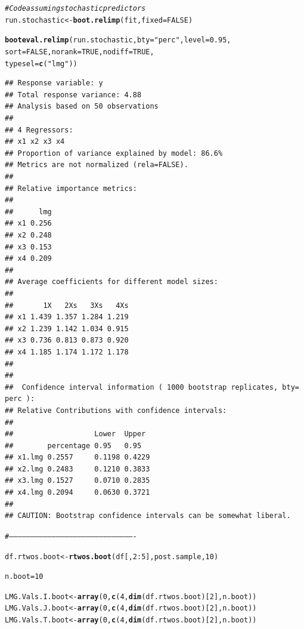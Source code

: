 \documentclass[11pt,a4paper,twoside]{book}
\makeatletter
\newcommand{\hlnum}[1]{\textcolor[rgb]{0.686,0.059,0.569}{#1}}%
\newcommand{\hlstr}[1]{\textcolor[rgb]{0.192,0.494,0.8}{#1}}%
\newcommand{\hlcom}[1]{\textcolor[rgb]{0.678,0.584,0.686}{\textit{#1}}}%
\newcommand{\hlopt}[1]{\textcolor[rgb]{0,0,0}{#1}}%
\newcommand{\hlstd}[1]{\textcolor[rgb]{0.345,0.345,0.345}{#1}}%
\newcommand{\hlkwb}[1]{\textcolor[rgb]{0.69,0.353,0.396}{#1}}%
\newcommand{\hlkwc}[1]{\textcolor[rgb]{0.333,0.667,0.333}{#1}}%
\newcommand{\hlkwd}[1]{\textcolor[rgb]{0.737,0.353,0.396}{\textbf{#1}}}%
\newenvironment{kframe}{%
 \def\at@end@of@kframe{}%
 \ifinner\ifhmode%
  \def\at@end@of@kframe{\end{minipage}}%
  \begin{minipage}{\columnwidth}%
 \fi\fi%
 \def\FrameCommand##1{\hskip\@totalleftmargin \hskip-\fboxsep
 \colorbox{shadecolor}{##1}\hskip-\fboxsep
     \hskip-\linewidth \hskip-\@totalleftmargin \hskip\columnwidth}%
 \MakeFramed {\advance\hsize-\width
   \@totalleftmargin\z@ \linewidth\hsize
   \@setminipage}}%
 {\par\unskip\endMakeFramed%
 \at@end@of@kframe}
\newenvironment{knitrout}{}{} %
\makeatother
\begin{document}
\begin{knitrout}
\color{fgcolor}\begin{kframe}
\begin{alltt}
\hlcom{#Code assuming stochastic predictors}
\hlstd{run.stochastic}\hlkwb{<-}\hlkwd{boot.relimp}\hlstd{(fit,} \hlkwc{fixed}\hlstd{=}\hlnum{FALSE}\hlstd{)}

\hlkwd{booteval.relimp}\hlstd{(run.stochastic,} \hlkwc{bty} \hlstd{=} \hlstr{"perc"}\hlstd{,} \hlkwc{level} \hlstd{=} \hlnum{0.95}\hlstd{,}
                \hlkwc{sort} \hlstd{=} \hlnum{FALSE}\hlstd{,} \hlkwc{norank} \hlstd{=} \hlnum{TRUE}\hlstd{,} \hlkwc{nodiff} \hlstd{=} \hlnum{TRUE}\hlstd{,}
                \hlkwc{typesel} \hlstd{=} \hlkwd{c}\hlstd{(}\hlstr{"lmg"}\hlstd{))}
\end{alltt}
\begin{verbatim}
## Response variable: y 
## Total response variance: 4.88 
## Analysis based on 50 observations 
## 
## 4 Regressors: 
## x1 x2 x3 x4 
## Proportion of variance explained by model: 86.6%
## Metrics are not normalized (rela=FALSE). 
## 
## Relative importance metrics: 
## 
##      lmg
## x1 0.256
## x2 0.248
## x3 0.153
## x4 0.209
## 
## Average coefficients for different model sizes: 
## 
##       1X   2Xs   3Xs   4Xs
## x1 1.439 1.357 1.284 1.219
## x2 1.239 1.142 1.034 0.915
## x3 0.736 0.813 0.873 0.920
## x4 1.185 1.174 1.172 1.178
## 
##  
##  Confidence interval information ( 1000 bootstrap replicates, bty= perc ): 
## Relative Contributions with confidence intervals: 
##  
##                   Lower  Upper
##        percentage 0.95   0.95  
## x1.lmg 0.2557     0.1198 0.4229
## x2.lmg 0.2483     0.1210 0.3833
## x3.lmg 0.1527     0.0710 0.2835
## x4.lmg 0.2094     0.0630 0.3721
## 
## CAUTION: Bootstrap confidence intervals can be somewhat liberal.
\end{verbatim}
\begin{alltt}
\hlcom{#----------------------------------------------------------------------------------------}


\hlstd{df.rtwos.boot} \hlkwb{<-}\hlkwd{rtwos.boot}\hlstd{(df[,}\hlnum{2}\hlopt{:}\hlnum{5}\hlstd{], post.sample,} \hlnum{10}\hlstd{)}

\hlstd{n.boot} \hlkwb{=} \hlnum{10}

\hlstd{LMG.Vals.I.boot}\hlkwb{<-}\hlkwd{array}\hlstd{(}\hlnum{0}\hlstd{,} \hlkwd{c}\hlstd{(}\hlnum{4}\hlstd{,}\hlkwd{dim}\hlstd{(df.rtwos.boot)[}\hlnum{2}\hlstd{], n.boot))}
\hlstd{LMG.Vals.J.boot}\hlkwb{<-}\hlkwd{array}\hlstd{(}\hlnum{0}\hlstd{,} \hlkwd{c}\hlstd{(}\hlnum{4}\hlstd{,}\hlkwd{dim}\hlstd{(df.rtwos.boot)[}\hlnum{2}\hlstd{], n.boot))}
\hlstd{LMG.Vals.T.boot}\hlkwb{<-}\hlkwd{array}\hlstd{(}\hlnum{0}\hlstd{,} \hlkwd{c}\hlstd{(}\hlnum{4}\hlstd{,}\hlkwd{dim}\hlstd{(df.rtwos.boot)[}\hlnum{2}\hlstd{], n.boot))}


\end{alltt}
\end{kframe}
\end{knitrout}
\end{document}

